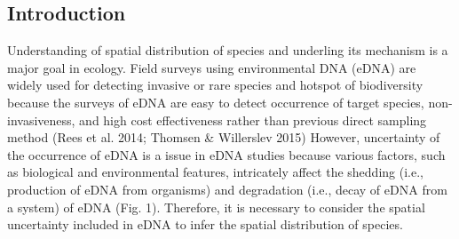 \documentclass[12pt]{article}
\begin{document}
\newpage
\begin{linenumbers}
\section{Introduction}
Understanding of spatial distribution of species and underling its mechanism is a major goal in ecology. 
Field surveys using environmental DNA (eDNA) are widely used for detecting invasive or rare species and hotspot of biodiversity %
because the surveys of eDNA are easy to detect occurrence of target species, non-invasiveness, and high cost effectiveness rather than previous direct sampling method (Rees et al. 2014; Thomsen \& Willerslev 2015) %
However, uncertainty of the occurrence of eDNA is a issue in eDNA studies because various factors, such as biological and environmental features, intricately affect the shedding (i.e., production of eDNA from organisms) and degradation (i.e., decay of eDNA from a system) of eDNA (Fig. 1). Therefore, it is necessary to consider the spatial uncertainty included in eDNA to infer the spatial distribution of species.




\end{linenumbers}
\end{document}
